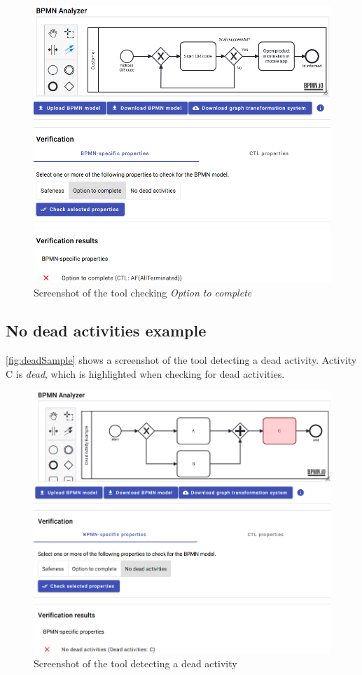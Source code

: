 \documentclass[runningheads]{llncs}
\begin{document}
\begin{figure}[ht]
    \centering
    \includegraphics[width=1\textwidth]{artifacts/appendix/option_to_complete_sample.png}
    \caption{Screenshot of the tool checking \textit{Option to complete}}
    \label{fig:optionToCompleteSample}
\end{figure}

\subsection{No dead activities example}
\autoref{fig:deadSample} shows a screenshot of the tool detecting a dead activity.
Activity C is \textit{dead}, which is highlighted when checking for dead activities.

\begin{figure}[ht]
    \centering
    \includegraphics[width=1\textwidth]{artifacts/appendix/dead_sample.png}
    \caption{Screenshot of the tool detecting a dead activity}
    \label{fig:deadSample}
\end{figure}
\end{document}
